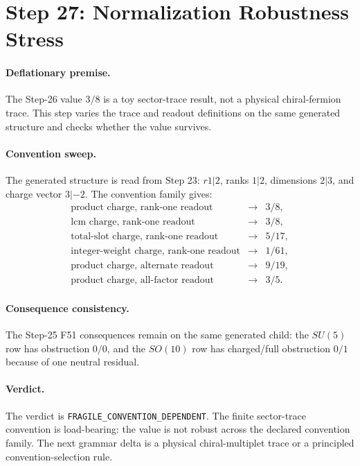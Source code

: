 \section{Step 27: Normalization Robustness Stress}

\paragraph{Deflationary premise.}
The Step-26 value \(3/8\) is a toy sector-trace result, not a physical chiral-fermion trace. This step varies the trace and readout definitions on the same generated structure and checks whether the value survives.

\paragraph{Convention sweep.}
The generated structure is read from Step 23: \(r1|2\), ranks \(1|2\), dimensions \(2|3\), and charge vector \(3|-2\). The convention family gives:
\[
\begin{array}{lll}
\text{product charge, rank-one readout} &\to& 3/8,\\
\text{lcm charge, rank-one readout} &\to& 3/8,\\
\text{total-slot charge, rank-one readout} &\to& 5/17,\\
\text{integer-weight charge, rank-one readout} &\to& 1/61,\\
\text{product charge, alternate readout} &\to& 9/19,\\
\text{product charge, all-factor readout} &\to& 3/5.
\end{array}
\]

\paragraph{Consequence consistency.}
The Step-25 F51 consequences remain on the same generated child: the \(SU(5)\) row has obstruction \(0/0\), and the \(SO(10)\) row has charged/full obstruction \(0/1\) because of one neutral residual.

\paragraph{Verdict.}
The verdict is \texttt{FRAGILE\_CONVENTION\_DEPENDENT}. The finite sector-trace convention is load-bearing: the value is not robust across the declared convention family. The next grammar delta is a physical chiral-multiplet trace or a principled convention-selection rule.
